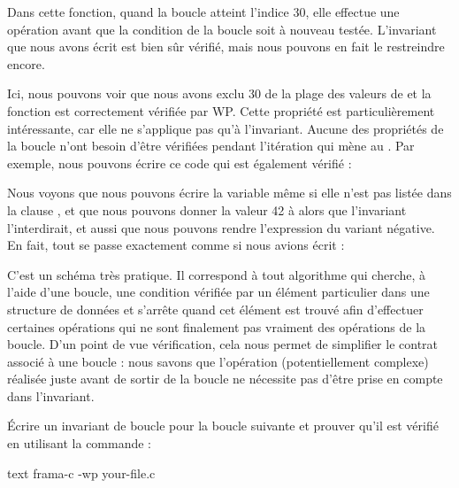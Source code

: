 Dans cette fonction, quand la boucle atteint l'indice 30, elle effectue une opération
 avant que la condition de la boucle soit à nouveau testée.
L'invariant que nous avons écrit est bien sûr vérifié, mais nous pouvons en fait le
restreindre encore.






Ici, nous pouvons voir que nous avons exclu 30 de la plage des valeurs de
 et la fonction est correctement vérifiée par WP. Cette propriété
est particulièrement intéressante, car elle ne s'applique pas qu'à l'invariant.
Aucune des propriétés de la boucle n'ont besoin d'être vérifiées pendant l'itération
qui mène au . Par exemple, nous pouvons écrire ce code qui est
également vérifié :





Nous voyons que nous pouvons écrire la variable  même si elle
n'est pas listée dans la clause , et que nous pouvons
donner la valeur 42 à  alors que l'invariant l'interdirait, et aussi
que nous pouvons rendre l'expression du variant négative. En fait, tout se passe
exactement comme si nous avions écrit :





C'est un schéma très pratique. Il correspond à tout algorithme qui cherche, à l'aide
d'une boucle, une condition vérifiée par un élément particulier dans une structure
de données et s'arrête quand cet élément est trouvé afin d'effectuer certaines
opérations qui ne sont finalement pas vraiment des opérations de la boucle. D'un
point de vue vérification, cela nous permet de simplifier le contrat associé à
une boucle : nous savons que l'opération (potentiellement complexe) réalisée
juste avant de sortir de la boucle ne nécessite pas d'être prise en compte dans
l'invariant.






Écrire un invariant de boucle pour la boucle suivante et prouver qu'il est vérifié
en utilisant la commande :


\begin{CodeBlock}{text}
frama-c -wp your-file.c
\end{CodeBlock}


